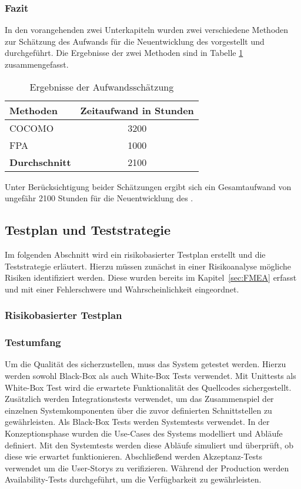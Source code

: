 \subsubsection{Fazit}
In den vorangehenden zwei Unterkapiteln wurden zwei verschiedene Methoden zur Schätzung des Aufwands für die Neuentwicklung des  vorgestellt und durchgeführt.
Die Ergebnisse der zwei Methoden sind in Tabelle \ref{tab:aufwandsschaetzungErgebnisse} zusammengefasst.
\begin{table}[H]
  \centering
  \begin{tabular}{|l|c|}
    \hline
    \textbf{Methoden} & \textbf{Zeitaufwand} in Stunden \\
    \hline
    \ac{COCOMO} & 3200 \\
    \hline
    \ac{FPA} & 1000 \\
    \hline
    \textbf{Durchschnitt} & 2100 \\
    \hline
  \end{tabular}
  \caption{Ergebnisse der Aufwandsschätzung}
  \label{tab:aufwandsschaetzungErgebnisse}
\end{table}

\noindent{}Unter Berücksichtigung beider Schätzungen ergibt sich ein Gesamtaufwand von ungefähr 2100 Stunden für die Neuentwicklung des .

\subsection{Testplan und Teststrategie}
Im folgenden Abschnitt wird ein risikobasierter Testplan erstellt und die Teststrategie erläutert.
Hierzu müssen zunächst in einer Risikoanalyse mögliche Risiken identifiziert werden.
Diese wurden bereits im Kapitel~\ref{sec:FMEA} erfasst und mit einer Fehlerschwere und Wahrscheinlichkeit eingeordnet.
\subsubsection{Risikobasierter Testplan}
\subsubsection*{Testumfang}
Um die Qualität des  sicherzustellen, muss das System getestet werden. Hierzu werden sowohl Black-Box als auch White-Box Tests verwendet.
Mit Unittests als White-Box Test wird die erwartete Funktionalität des Quellcodes sichergestellt.
Zusätzlich werden Integrationstests verwendet, um das Zusammenspiel der einzelnen Systemkomponenten über die zuvor definierten Schnittstellen zu gewährleisten.
\newparagraph
Als Black-Box Tests werden Systemtests verwendet.
In der Konzeptionsphase wurden die Use-Cases des Systems modelliert und Abläufe definiert.
Mit den Systemtests werden diese Abläufe simuliert und überprüft, ob diese wie erwartet funktionieren.
Abschließend werden Akzeptanz-Tests verwendet um die User-Storys zu verifizieren.
Während der Production werden Availability-Tests durchgeführt, um die Verfügbarkeit zu gewährleisten.
